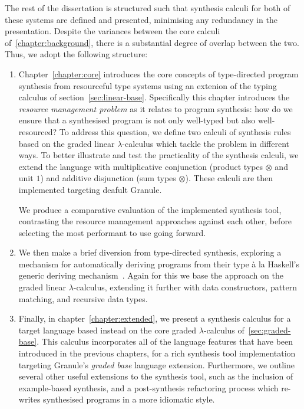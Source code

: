 The rest of the dissertation is structured such that synthesis calculi for both
of these systems are defined and presented, minimising any redundancy in the
presentation. Despite the variances between the core calculi
of~\ref{chapter:background}, there is a substantial degree of overlap between
the two. Thus, we adopt the following structure: 
\begin{enumerate}
        \item Chapter~\ref{chapter:core} introduces the core concepts of
        type-directed program synthesis from resourceful type systems using an
        extenion of the typing calculus of section~\ref{sec:linear-base}.
        Specifically this chapter introduces the \textit{resource management
        problem} as it relates to program synthesis: how do we ensure that a
        synthesised program is not only well-typed but also
        well-resourced? To address this question, we define two calculi
        of synthesis rules based on the graded linear $\lambda$-calculus which
        tackle the problem in different ways. To better illustrate and test the
        practicality of the synthesis calculi, we extend the language with
        multiplicative conjunction (product types $\otimes$ and unit $1$) and
        additive disjunction (sum types $\otimes$). These calculi are then
        implemented targeting deafult Granule.

        We produce a comparative evaluation of the implemented synthesis tool, 
        contrasting the resource management approaches against each other, before 
        selecting the most performant to use going forward.  

        \item We then make a brief diversion from type-directed synthesis,
        exploring a mechanism for automatically deriving programs from their
        type à la Haskell's generic deriving mechanism~\cite{generic-deriving}.
        Again for this we base the approach on the graded linear
        $\lambda$-calculus, extending it further with data constructors, pattern
        matching, and recursive data types.
        \item Finally, in chapter~\ref{chapter:extended}, we present a synthesis
        calculus for a target language based instead on the core graded
        $\lambda$-calculus of~\ref{sec:graded-base}. This calculus incorporates
        all of the language features that have been introduced in the previous chapters,
        for a rich synthesis tool implementation targeting Granule's
        \emph{graded base} language extension. Furthermore, we outline several other useful 
        extensions to the synthesis tool, such as the inclusion of example-based synthesis,
        and a post-synthesis refactoring process which re-writes synthesised programs in 
        a more idiomatic style.


\end{enumerate}
